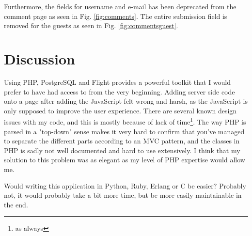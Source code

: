 \documentclass[a4paper]{scrartcl}
\begin{document}
Furthermore, the fields for username and e-mail has been deprecated from the comment page as seen in Fig. \ref{fig:comments}. The entire submission field is removed for the guests as seen in Fig. \ref{fig:commentsguest}.

\newpage
\section{Discussion}

Using PHP, PostgreSQL and Flight provides a powerful toolkit that I would prefer to have had access to from the very beginning. Adding server side code onto a page after adding the JavaScript felt wrong and harsh, as the JavaScript is only supposed to improve the user experience. There are several known design issues with my code, and this is mostly because of lack of time\footnote{as always}. The way PHP is parsed in a "top-down" sense makes it very hard to confirm that you've managed to separate the different parts according to an MVC pattern, and the classes in PHP is sadly not well documented and hard to use extensively. I think that my solution to this problem was as elegant as my level of PHP expertise would allow me.

Would writing this application in Python, Ruby, Erlang or C be easier? Probably not, it would probably take a bit more time, but be more easily maintainable in the end. 
\end{document}
